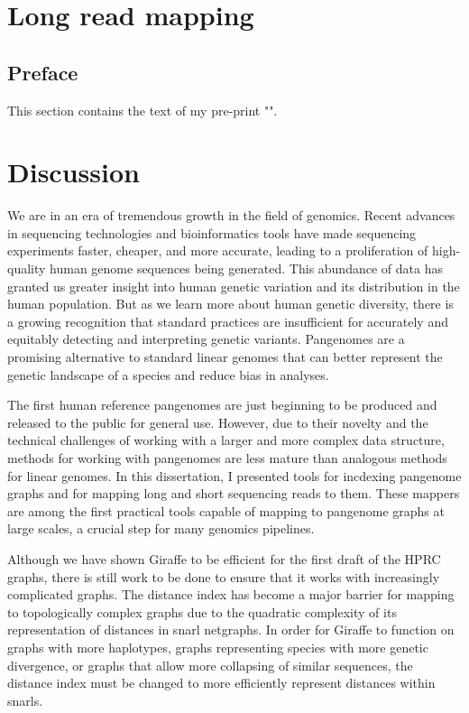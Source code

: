 \documentclass[11pt]{ucscthesis}
\begin{document}
\chapter{Long read mapping}
\label{chapter:lr-giraffe}
\section{Preface}
This section contains the text of my pre-print "".


\chapter{Discussion}

We are in an era of tremendous growth in the field of genomics.
Recent advances in sequencing technologies and bioinformatics tools have made sequencing experiments faster, cheaper, and more accurate, leading to a proliferation of high-quality human genome sequences being generated.
This abundance of data has granted us greater insight into human genetic variation and its distribution in the human population.
But as we learn more about human genetic diversity, there is a growing recognition that standard practices are insufficient for accurately and equitably detecting and interpreting genetic variants. 
Pangenomes are a promising alternative to standard linear genomes that can better represent the genetic landscape of a species and reduce bias in analyses.

The first human reference pangenomes are just beginning to be produced and released to the public for general use.
However, due to their novelty and the technical challenges of working with a larger and more complex data structure, methods for working with pangenomes are less mature than analogous methods for linear genomes.
In this dissertation, I presented tools for incdexing pangenome graphs and for mapping long and short sequencing reads to them.
These mappers are among the first practical tools capable of mapping to pangenome graphs at large scales, a crucial step for many genomics pipelines.

Although we have shown Giraffe to be efficient for the first draft of the HPRC graphs, there is still work to be done to ensure that it works with increasingly complicated graphs.
The distance index has become a major barrier for mapping to topologically complex graphs due to the quadratic complexity of its representation of distances in snarl netgraphs.
In order for Giraffe to function on graphs with more haplotypes, graphs representing species with more genetic divergence, or graphs that allow more collapsing of similar sequences, the distance index must be changed to more efficiently represent distances within snarls.
\end{document}
